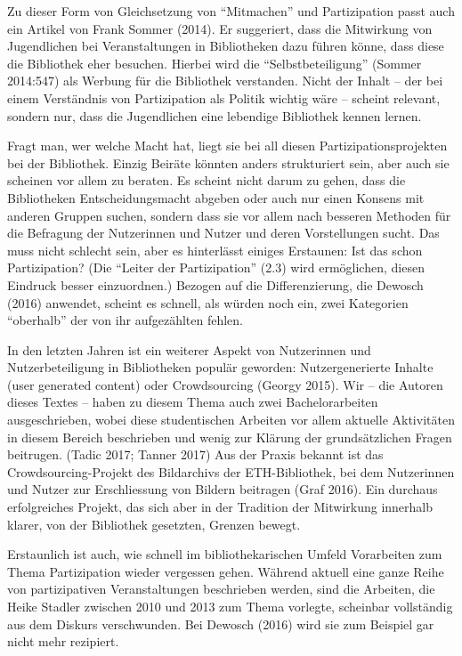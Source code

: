 \documentclass[a4paper,
fontsize=11pt,
oneside,
numbers=noperiodatend,
parskip=half-,
bibliography=totoc,
final
]{scrartcl}
\begin{document}
Zu dieser Form von Gleichsetzung von \enquote{Mitmachen} und
Partizipation passt auch ein Artikel von Frank Sommer (2014). Er
suggeriert, dass die Mitwirkung von Jugendlichen bei Veranstaltungen in
Bibliotheken dazu führen könne, dass diese die Bibliothek eher besuchen.
Hierbei wird die \enquote{Selbstbeteiligung} (Sommer 2014:547) als
Werbung für die Bibliothek verstanden. Nicht der Inhalt -- der bei einem
Verständnis von Partizipation als Politik wichtig wäre -- scheint
relevant, sondern nur, dass die Jugendlichen eine lebendige Bibliothek
kennen lernen.

Fragt man, wer welche Macht hat, liegt sie bei all diesen
Partizipationsprojekten bei der Bibliothek. Einzig Beiräte könnten
anders strukturiert sein, aber auch sie scheinen vor allem zu beraten.
Es scheint nicht darum zu gehen, dass die Bibliotheken
Entscheidungsmacht abgeben oder auch nur einen Konsens mit anderen
Gruppen suchen, sondern dass sie vor allem nach besseren Methoden für
die Befragung der Nutzerinnen und Nutzer und deren Vorstellungen sucht.
Das muss nicht schlecht sein, aber es hinterlässt einiges Erstaunen: Ist
das schon Partizipation? (Die \enquote{Leiter der Partizipation} (2.3)
wird ermöglichen, diesen Eindruck besser einzuordnen.) Bezogen auf die
Differenzierung, die Dewosch (2016) anwendet, scheint es schnell, als
würden noch ein, zwei Kategorien \enquote{oberhalb} der von ihr
aufgezählten fehlen.

In den letzten Jahren ist ein weiterer Aspekt von Nutzerinnen und
Nutzerbeteiligung in Bibliotheken populär geworden: Nutzergenerierte
Inhalte (user generated content) oder Crowdsourcing (Georgy 2015). Wir
-- die Autoren dieses Textes -- haben zu diesem Thema auch zwei
Bachelorarbeiten ausgeschrieben, wobei diese studentischen Arbeiten vor
allem aktuelle Aktivitäten in diesem Bereich beschrieben und wenig zur
Klärung der grundsätzlichen Fragen beitrugen. (Tadic 2017; Tanner 2017)
Aus der Praxis bekannt ist das Crowdsourcing-Projekt des Bildarchivs der
ETH-Bibliothek, bei dem Nutzerinnen und Nutzer zur Erschliessung von
Bildern beitragen (Graf 2016). Ein durchaus erfolgreiches Projekt, das
sich aber in der Tradition der Mitwirkung innerhalb klarer, von der
Bibliothek gesetzten, Grenzen bewegt.

Erstaunlich ist auch, wie schnell im bibliothekarischen Umfeld
Vorarbeiten zum Thema Partizipation wieder vergessen gehen. Während
aktuell eine ganze Reihe von partizipativen Veranstaltungen beschrieben
werden, sind die Arbeiten, die Heike Stadler zwischen 2010 und 2013 zum
Thema vorlegte, scheinbar vollständig aus dem Diskurs verschwunden. Bei
Dewosch (2016) wird sie zum Beispiel gar nicht mehr rezipiert.
\end{document}

